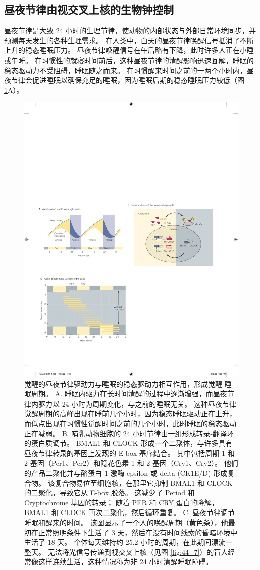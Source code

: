\subsection{昼夜节律由视交叉上核的生物钟控制}

昼夜节律是大致 24 小时的生理节律，使动物的内部状态与外部日常环境同步，并预测每天发生的各种生理需求。
在人类中，白天的昼夜节律唤醒信号抵消了不断上升的稳态睡眠压力。
昼夜节律唤醒信号在午后略有下降，此时许多人正在小睡或午睡。
在习惯性的就寝时间前后，这种昼夜节律的清醒影响迅速瓦解，睡眠的稳态驱动力不受阻碍，睡眠随之而来。
在习惯醒来时间之前的一两个小时内，昼夜节律会促进睡眠以确保充足的睡眠，因为睡眠后期的稳态睡眠压力较低（图 \ref{fig:44_6}A）。


\begin{figure}[htbp]
	\centering
	\includegraphics[width=0.55\linewidth]{chap44/fig_44_6}
	\caption{觉醒的昼夜节律驱动力与睡眠的稳态驱动力相互作用，形成觉醒-睡眠周期。 A. 睡眠内驱力在长时间清醒的过程中逐渐增强，而昼夜节律内驱力以 24 小时为周期变化，与之前的睡眠无关。 这种昼夜节律觉醒周期的高峰出现在睡前几个小时，因为稳态睡眠驱动正在上升，而低点出现在习惯性觉醒时间之前的几个小时，此时睡眠的稳态驱动正在减弱。 B. 哺乳动物细胞的 24 小时节律由一组形成转录-翻译环的蛋白质调节。 BMAL1 和 CLOCK 形成一个二聚体，与许多具有昼夜节律转录的基因上发现的 E-box 基序结合。 其中包括周期 1 和 2 基因（Per1、Per2）和隐花色素 1 和 2 基因（Cry1、Cry2）。 他们的产品二聚化并与酪蛋白 1 激酶 epsilon 或 delta (CK1E/D) 形成复合物。 该复合物易位至细胞核，在那里它抑制 BMAL1 和 CLOCK 的二聚化，导致它从 E-box 脱落。 这减少了 Period 和 Cryptochrome 基因的转录； 随着 PER 和 CRY 蛋白的降解，BMAL1 和 CLOCK 再次二聚化，然后循环重复。 C. 昼夜节律调节睡眠和醒来的时间。 该图显示了一个人的唤醒周期（黄色条），他最初在正常照明条件下生活了 3 天，然后在没有时间线索的昏暗环境中生活了 18 天。 个体每天维持约 25.2 小时的周期，在此期间漂流一整天。 无法将光信号传递到视交叉上核（见图 \ref{fig:44_7}）的盲人经常像这样连续生活，这种情况称为非 24 小时清醒睡眠障碍。}
	\label{fig:44_6}
\end{figure}


